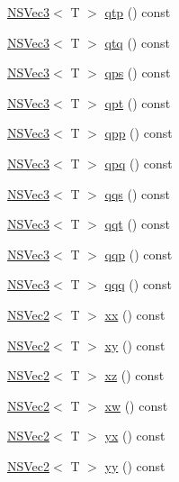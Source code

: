 \begin{DoxyCompactItemize}
\item 
\hyperlink{structNSVec3}{N\-S\-Vec3}$<$ T $>$ \hyperlink{structNSVec4_a0fd77eed5eeca2de915bca7f7426c073}{qtp} () const 
\item 
\hyperlink{structNSVec3}{N\-S\-Vec3}$<$ T $>$ \hyperlink{structNSVec4_ad1b0194310ebf575510f43d3fbc4e607}{qtq} () const 
\item 
\hyperlink{structNSVec3}{N\-S\-Vec3}$<$ T $>$ \hyperlink{structNSVec4_a86297bdc4c83f04f7b798f5994d30c96}{qps} () const 
\item 
\hyperlink{structNSVec3}{N\-S\-Vec3}$<$ T $>$ \hyperlink{structNSVec4_a7effef259a423b3b8bd6e94215358be5}{qpt} () const 
\item 
\hyperlink{structNSVec3}{N\-S\-Vec3}$<$ T $>$ \hyperlink{structNSVec4_a6cbec5e6b870001c7fda219b7291770e}{qpp} () const 
\item 
\hyperlink{structNSVec3}{N\-S\-Vec3}$<$ T $>$ \hyperlink{structNSVec4_adc62281f9076d94409c4709f7c5dea52}{qpq} () const 
\item 
\hyperlink{structNSVec3}{N\-S\-Vec3}$<$ T $>$ \hyperlink{structNSVec4_a5c3cf053b162767f298302838e3b93f4}{qqs} () const 
\item 
\hyperlink{structNSVec3}{N\-S\-Vec3}$<$ T $>$ \hyperlink{structNSVec4_a7b83db29673d647dabf34eb42835381e}{qqt} () const 
\item 
\hyperlink{structNSVec3}{N\-S\-Vec3}$<$ T $>$ \hyperlink{structNSVec4_a4c043beeeaadff412196a1760a79ff4b}{qqp} () const 
\item 
\hyperlink{structNSVec3}{N\-S\-Vec3}$<$ T $>$ \hyperlink{structNSVec4_a5ce20566421056ff8a2bdb40a4491efb}{qqq} () const 
\item 
\hyperlink{structNSVec2}{N\-S\-Vec2}$<$ T $>$ \hyperlink{structNSVec4_af552ff196af72a7bca4a1f487aa1494d}{xx} () const 
\item 
\hyperlink{structNSVec2}{N\-S\-Vec2}$<$ T $>$ \hyperlink{structNSVec4_ad46b30c4093a912f1f52811fa4d0397e}{xy} () const 
\item 
\hyperlink{structNSVec2}{N\-S\-Vec2}$<$ T $>$ \hyperlink{structNSVec4_a07245a54fc34e9c99698a50e1eac09be}{xz} () const 
\item 
\hyperlink{structNSVec2}{N\-S\-Vec2}$<$ T $>$ \hyperlink{structNSVec4_ab794f221682524e263e3344a4c3197f0}{xw} () const 
\item 
\hyperlink{structNSVec2}{N\-S\-Vec2}$<$ T $>$ \hyperlink{structNSVec4_aebc0c879d8ff05397670198a8ba841a8}{yx} () const 
\item 
\hyperlink{structNSVec2}{N\-S\-Vec2}$<$ T $>$ \hyperlink{structNSVec4_ad9e098197a30520ae3559c6640e3beab}{yy} () const 

\end{DoxyCompactItemize}
